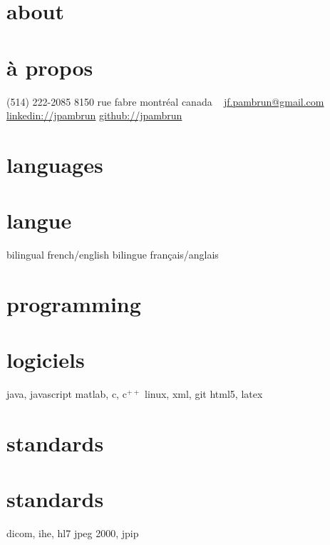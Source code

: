 \documentclass[print]{friggeri-cv}
\begin{document}
\ifdefined\isenglish
{}
\else
{}
\fi



\begin{aside}
    \ifdefined\isenglish\section{about}\else\section{à propos}\fi
    {\small(514) 222-2085}
    {\small8150} rue fabre
    montréal
    canada
    ~
    \href{mailto:jf.pambrun@gmail.com}{jf.pambrun@gmail.com}
    \href{https://ca.linkedin.com/in/jpambrun}{linkedin://jpambrun}
    \href{http://github.com/jpambrun}{github://jpambrun}
    \ifdefined\isenglish\section{languages}\else\section{langue}\fi
    \ifdefined\isenglish bilingual french/english \else bilingue français/anglais \fi
    \ifdefined\isenglish\section{programming}\else\section{logiciels}\fi
    java, javascript
    matlab, c, c{\tiny$^{++}$}
    linux, xml, git
    html{\small5}, latex
    \ifdefined\isenglish\section{standards}\else\section{standards}\fi
    dicom, ihe, hl{\small7}
    jpeg {\small2000}, jpip
\end{aside}

\end{document}
